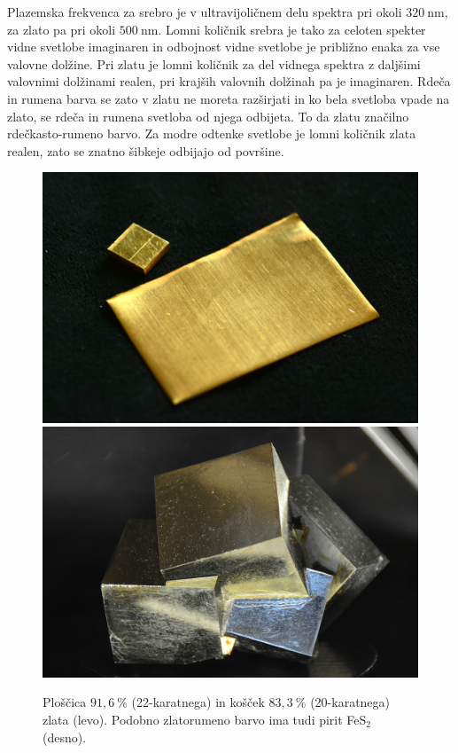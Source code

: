 Plazemska frekvenca za srebro je v ultravijoličnem delu spektra 
pri okoli $320~\si{\nano\meter}$, za zlato pa pri okoli $500~\si{\nano\meter}$.
Lomni količnik srebra je tako za celoten spekter vidne svetlobe imaginaren in odbojnost
vidne svetlobe je približno enaka za vse valovne dolžine. Pri zlatu je lomni 
količnik za del vidnega spektra z daljšimi valovnimi dolžinami realen, pri 
krajših valovnih dolžinah pa je imaginaren. Rdeča in rumena barva se zato v zlatu 
ne moreta razširjati in ko bela svetloba vpade na zlato, se rdeča in rumena svetloba
od njega odbijeta. To da zlatu značilno rdečkasto-rumeno barvo. Za modre odtenke
svetlobe je lomni količnik zlata realen, zato se znatno šibkeje odbijajo od površine.
\begin{figure}[ht]
\centering
\includegraphics[width=7truecm]{slike/09_zlato.jpg}\hfill
\includegraphics[width=7truecm]{slike/09_pirit.jpg}
\caption{Ploščica $91,6~\%$ (22-karatnega) in košček $83,3~\%$ (20-karatnega) zlata (levo). 
Podobno zlatorumeno barvo ima tudi pirit FeS$_2$ (desno).}
\label{fig:09_zlato}
\end{figure}
